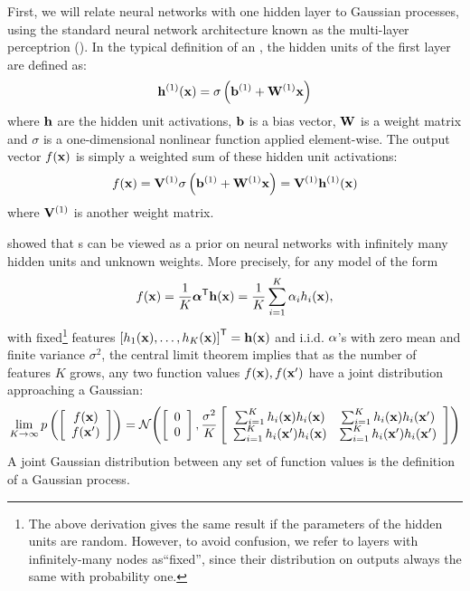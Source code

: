 First, we will relate neural networks with one hidden layer to Gaussian processes, using the
standard neural network architecture known as the multi-layer perceptrion (\MLP{}).
In the typical definition of an \MLP{}, the hidden units of the first layer are defined as:
%
\begin{align}
{\bf{h}}^{(1)}({\bf{x}}) = \sigma \left( {\bf{b}}^{(1)} + \mathbf{W}^{(1)}{\bf{x}} \right)
\end{align}
%
where ${\bf{h}}$ are the hidden unit activations, ${\bf{b}}$ is a bias vector, $\mathbf{W}$ is a weight matrix and $\sigma$ is a one-dimensional nonlinear function applied element-wise. The output vector $f({\bf{x}})$ is simply a weighted sum of these hidden unit activations:
%
\begin{align}
f({\bf{x}}) = \mathbf{V}^{(1)} \sigma \left( {\bf{b}}^{(1)} + \mathbf{W}^{(1)} {\bf{x}} \right)  = \mathbf{V}^{(1)} {\bf{h}}^{(1)}({\bf{x}})
\label{eq:one-layer-nn}
\end{align}
%
where $\mathbf{V}^{(1)}$ is another weight matrix.

\citet{neal1995bayesian} showed that \gp{}s can be viewed as a prior on neural networks with infinitely many hidden units and unknown weights.
More precisely, for any model of the form
%
\begin{align}
f({\bf{x}}) = \frac{1}{K}{\mathbf {\boldsymbol{\alpha}}}^{\mathsf{T}} {\bf{h}}({\bf{x}}) = \frac{1}{K} \sum_{i=1}^K \alpha_i h_i({\bf{x}}),
\label{eq:one-layer-gp}
\end{align}
%
with fixed\footnote{The above derivation gives the same result if the parameters of the hidden units are random.
However, to avoid confusion, we refer to layers with infinitely-many nodes as``fixed'', since their distribution on outputs always the same with probability one.} features $\left[ h_1({\bf{x}}), \dots, h_K({\bf{x}}) \right]^{\mathsf{T}} = {\bf{h}}({\bf{x}})$ and i.i.d. $\alpha$'s with zero mean and finite variance $\sigma^2$, the central limit theorem implies that as the number of features $K$ grows, any two function values $f({\bf{x}}), f({\bf{x}}')$ have a joint distribution approaching a Gaussian:
%
\begin{align}
\lim_{K \to \infty} p\left( \left[ \begin{array}{c} {f({\bf{x}})} \\ {f({\bf{x}}')} \end{array} \right] \right) = \mathcal{N}\!\left(\left[ \begin{array}{c} {0} \\ {0} \end{array} \right],
\frac{\sigma^2}{K} \left[ \begin{array}{cc}
\sum_{i=1}^K h_i({\bf{x}})h_i({\bf{x}}) &
\sum_{i=1}^K h_i({\bf{x}})h_i({\bf{x}}') \\
\sum_{i=1}^K h_i({\bf{x}}')h_i({\bf{x}}) &
\sum_{i=1}^K h_i({\bf{x}}')h_i({\bf{x}}')
\end{array} \right] \right)
\end{align}
A joint Gaussian distribution between any set of function values is the definition of a Gaussian process.

